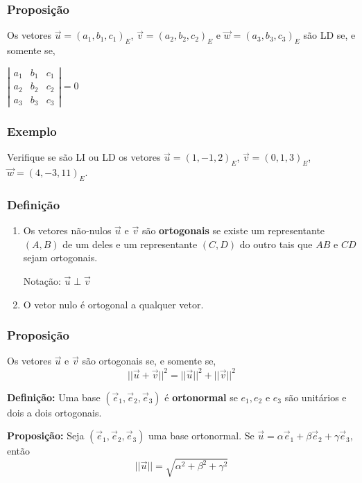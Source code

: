 \documentclass[hyperref={pdfpagelabels=false}]{beamer}
\begin{document}
\begin{frame}
\frametitle{Proposição}

Os vetores $\overrightarrow{u} = (a_1,b_1,c_1)_E$, $\overrightarrow{v} = (a_2,b_2,c_2)_E$ e $\overrightarrow{w} = (a_3,b_3,c_3)_E$ são LD se, e somente se,
\begin{center}
	$\left|
	\begin{array}{ccc}
	a_1	&	b_1	&	c_1	\\
	a_2	&	b_2	&	c_2	\\
	a_3	&	b_3	&	c_3
	\end{array}
	\right| = 0
	$
\end{center}


\end{frame}

\begin{frame}
\frametitle{Exemplo}

Verifique se são LI ou LD os vetores $\overrightarrow{u} = (1,-1,2)_E$, $\overrightarrow{v} = (0,1,3)_E$, $\overrightarrow{w} = (4,-3,11)_E$.

\end{frame}

\begin{frame}
\frametitle{Definição}

\begin{enumerate}
	\item Os vetores não-nulos $\overrightarrow{u}$ e $\overrightarrow{v}$ são {\bf ortogonais} se existe um representante $(A,B)$ de um deles e um representante $(C,D)$ do outro tais que $AB$ e $CD$ sejam ortogonais.
	
	Notação: $\overrightarrow{u} \perp \overrightarrow{v}$
	\item O vetor nulo é ortogonal a qualquer vetor.
\end{enumerate}

\end{frame}


\begin{frame}
\frametitle{Proposição}

Os vetores $\overrightarrow{u}$ e $\overrightarrow{v}$ são ortogonais se, e somente se, $$||\overrightarrow{u} + \overrightarrow{v}||^2 = ||\overrightarrow{u}||^2 + ||\overrightarrow{v}||^2$$

\pause

{\bf Definição: } Uma base $(\overrightarrow{e}_1,\overrightarrow{e}_2,\overrightarrow{e}_3)$ é {\bf ortonormal} se $e_1,e_2$ e $e_3$ são unitários e dois a dois ortogonais.

\pause

{\bf Proposição: } Seja $(\overrightarrow{e}_1,\overrightarrow{e}_2,\overrightarrow{e}_3)$ uma base ortonormal. Se $\overrightarrow{u} = \alpha\overrightarrow{e}_1 + \beta\overrightarrow{e}_2+\gamma\overrightarrow{e}_3$, então
$$||\overrightarrow{u}|| = \sqrt{\alpha^2 + \beta^2 + \gamma^2}$$

\end{frame}
\end{document}
